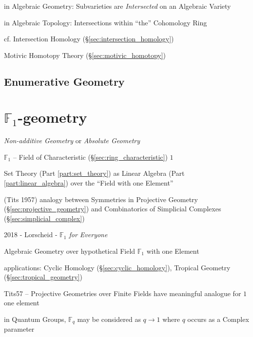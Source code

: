 in Algebraic Geometry: Subvarieties are \emph{Intersected} on an
Algebraic Variety

in Algebraic Topology: Intersections within ``the'' Cohomology Ring

\fist cf. Intersection Homology (\S\ref{sec:intersection_homology})

\fist Motivic Homotopy Theory (\S\ref{sec:motivic_homotopy})



\subsection{Enumerative Geometry}\label{sec:enumerative_geometry}



\section{$\mathbb{F}_1$-geometry}\label{sec:f1_geometry}

\emph{Non-additive Geometry} or \emph{Absolute Geometry}

$\mathbb{F}_1$ -- Field of Characteristic (\S\ref{sec:ring_characteristic}) $1$

Set Theory (Part \ref{part:set_theory}) as Linear Algebra (Part
\ref{part:linear_algebra}) over the ``Field with one Element''

(Tits 1957) analogy between Symmetries in Projective Geometry
(\S\ref{sec:projective_geometry}) and Combinatorics of Simplicial Complexes
(\S\ref{sec:simplicial_complex})

2018 - Lorscheid - \emph{$\mathbb{F}_1$ for Everyone}

Algebraic Geometry over hypothetical Field $\mathbb{F}_1$ with one Element

applications: Cyclic Homology (\S\ref{sec:cyclic_homology}), Tropical Geometry
(\S\ref{sec:tropical_geometry})

Tits57 -- Projective Geometries over Finite Fields have meaningful analogue for
$1$ one element

in Quantum Groups, $\mathbb{F}_q$ may be considered as $q \rightarrow 1$ where
$q$ occurs as a Complex parameter

